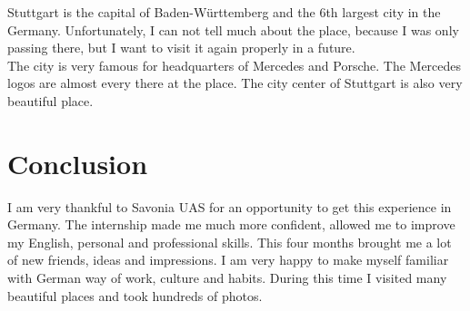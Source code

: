 \documentclass[english]{article}
\begin{document}
Stuttgart is the capital of Baden-Württemberg and the 6th largest city in the Germany. Unfortunately, I can not tell much about the place, because I was only passing there, but I want to visit it again properly in a future.\\

The city is very famous for headquarters of Mercedes and Porsche. The Mercedes logos are almost every there at the place. The city center of Stuttgart is also very beautiful place.

\section{Conclusion}
I am very thankful to Savonia UAS for an opportunity to get this experience in Germany. The internship made me much more confident, allowed me to improve my English, personal and professional skills. This four months brought me a lot of new friends, ideas and impressions. I am very happy to make myself familiar with German way of work, culture and habits. During this time I visited many beautiful places and took hundreds of photos.
\end{document}
